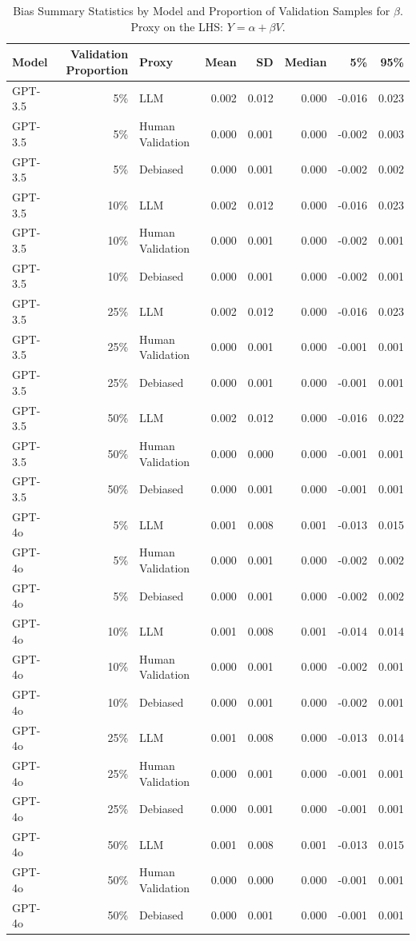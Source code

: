 \begin{table}

\caption{Bias Summary Statistics by Model and Proportion of Validation Samples for $\beta$. Proxy on the LHS: $Y = \alpha + \beta V$.}
\centering
\begin{tabular}[t]{lrlrrrrr}
\toprule
Model & Validation Proportion & Proxy & Mean & SD & Median & 5\% & 95\%\\
\midrule
GPT-3.5 & 5\% & LLM & 0.002 & 0.012 & 0.000 & -0.016 & 0.023\\
GPT-3.5 & 5\% & Human Validation & 0.000 & 0.001 & 0.000 & -0.002 & 0.003\\
GPT-3.5 & 5\% & Debiased & 0.000 & 0.001 & 0.000 & -0.002 & 0.002\\
GPT-3.5 & 10\% & LLM & 0.002 & 0.012 & 0.000 & -0.016 & 0.023\\
GPT-3.5 & 10\% & Human Validation & 0.000 & 0.001 & 0.000 & -0.002 & 0.001\\
GPT-3.5 & 10\% & Debiased & 0.000 & 0.001 & 0.000 & -0.002 & 0.001\\
GPT-3.5 & 25\% & LLM & 0.002 & 0.012 & 0.000 & -0.016 & 0.023\\
GPT-3.5 & 25\% & Human Validation & 0.000 & 0.001 & 0.000 & -0.001 & 0.001\\
GPT-3.5 & 25\% & Debiased & 0.000 & 0.001 & 0.000 & -0.001 & 0.001\\
GPT-3.5 & 50\% & LLM & 0.002 & 0.012 & 0.000 & -0.016 & 0.022\\
GPT-3.5 & 50\% & Human Validation & 0.000 & 0.000 & 0.000 & -0.001 & 0.001\\
GPT-3.5 & 50\% & Debiased & 0.000 & 0.001 & 0.000 & -0.001 & 0.001\\
GPT-4o & 5\% & LLM & 0.001 & 0.008 & 0.001 & -0.013 & 0.015\\
GPT-4o & 5\% & Human Validation & 0.000 & 0.001 & 0.000 & -0.002 & 0.002\\
GPT-4o & 5\% & Debiased & 0.000 & 0.001 & 0.000 & -0.002 & 0.002\\
GPT-4o & 10\% & LLM & 0.001 & 0.008 & 0.001 & -0.014 & 0.014\\
GPT-4o & 10\% & Human Validation & 0.000 & 0.001 & 0.000 & -0.002 & 0.001\\
GPT-4o & 10\% & Debiased & 0.000 & 0.001 & 0.000 & -0.002 & 0.001\\
GPT-4o & 25\% & LLM & 0.001 & 0.008 & 0.000 & -0.013 & 0.014\\
GPT-4o & 25\% & Human Validation & 0.000 & 0.001 & 0.000 & -0.001 & 0.001\\
GPT-4o & 25\% & Debiased & 0.000 & 0.001 & 0.000 & -0.001 & 0.001\\
GPT-4o & 50\% & LLM & 0.001 & 0.008 & 0.001 & -0.013 & 0.015\\
GPT-4o & 50\% & Human Validation & 0.000 & 0.000 & 0.000 & -0.001 & 0.001\\
GPT-4o & 50\% & Debiased & 0.000 & 0.001 & 0.000 & -0.001 & 0.001\\
\bottomrule
\end{tabular}
\end{table}
